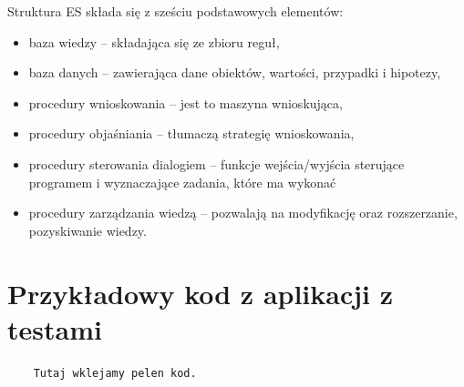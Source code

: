 \documentclass[12pt,a4paper]{article}
\begin{document}
	Struktura ES składa się z sześciu podstawowych elementów:
	\begin{itemize}
		\item baza wiedzy -- składająca się ze zbioru reguł,
		\item baza danych -- zawierająca dane obiektów, wartości, przypadki i hipotezy,
		\item procedury wnioskowania -- jest to maszyna wnioskująca,
		\item procedury objaśniania -- tłumaczą strategię wnioskowania,
		\item procedury sterowania dialogiem -- funkcje wejścia/wyjścia sterujące programem i wyznaczające zadania, które ma wykonać
		\item procedury zarządzania wiedzą -- pozwalają na modyfikację oraz rozszerzanie, pozyskiwanie wiedzy.
	\end{itemize}
	
	
	
	
	
	
	

\section*{Przykładowy kod z aplikacji z testami}


\begin{lstlisting}
	Tutaj wklejamy pelen kod. 
\end{lstlisting}
\end{document}
